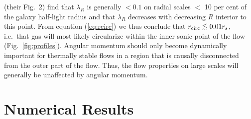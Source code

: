 \documentclass[usenatbib,fleqn]{mn2e}
\begin{document}
\citet{EmsellemCappellari+:2007a} (their Fig.~2) find that $\lambda_R$
is generally $< 0.1$ on radial scales $<$ 10 per cent of the galaxy
half-light radius and that $\lambda_R$ decreases with decreasing $R$
interior to this point.  From equation (\ref{eq:rcirc}) we thus
conclude that $r_{\rm circ} \lesssim 0.01r_{s}$, i.e.~that gas will most likely
circularize within the inner sonic point of the flow (Fig.~\ref{fig:profiles}).  Angular momentum should only become
dynamically important for thermally stable flows in a region that is
causally disconnected from the outer part of the flow. Thus, the flow
properties on large scales will generally be unaffected by angular momentum.




\section{Numerical Results}
\label{sec:numerical}
\end{document}
